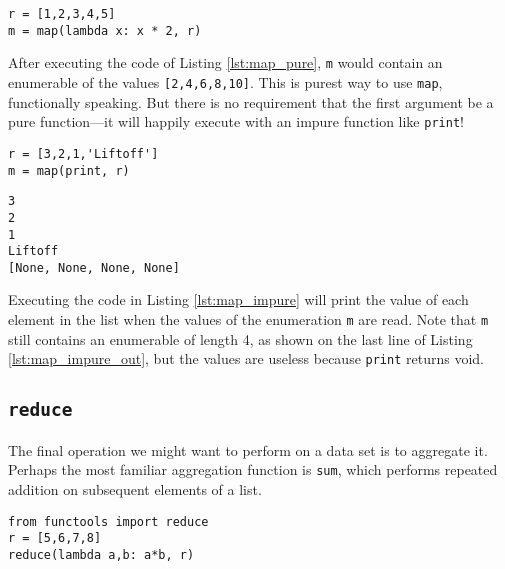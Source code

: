 \documentclass[ignorenonframetext,red]{beamer}
\begin{document}
\begin{frame}[fragile]
\begin{lstlisting}[style=python,caption={Doubling Each Element},label={lst:map_pure}]
r = [1,2,3,4,5]
m = map(lambda x: x * 2, r)
\end{lstlisting}
\end{frame}

\noindent After executing the code of Listing \ref{lst:map_pure}, \texttt{m} would contain an enumerable of the values \texttt{[2,4,6,8,10]}. This is purest way to use \texttt{map}, functionally speaking. But there is no requirement that the first argument be a pure function---it will happily execute with an impure function like \texttt{print}!

\begin{frame}[fragile]
\begin{lstlisting}[style=python,caption={\texttt{map} With an Impure Function},label={lst:map_impure}]
r = [3,2,1,'Liftoff']
m = map(print, r)
\end{lstlisting}
\end{frame}

\begin{lstlisting}[caption={Output of Listing \ref{lst:map_impure}},label={lst:map_impure_out}]
3
2
1
Liftoff
[None, None, None, None]
\end{lstlisting}

\noindent Executing the code in Listing \ref{lst:map_impure} will print the value of each element in the list when the values of the enumeration \texttt{m} are read. Note that \texttt{m} still contains an enumerable of length 4, as shown on the last line of Listing \ref{lst:map_impure_out}, but the values are useless because \texttt{print} returns void.

\subsection{\tt reduce}
The final operation we might want to perform on a data set is to aggregate it. Perhaps the most familiar aggregation function is \texttt{sum}, which performs repeated addition on subsequent elements of a list.

\begin{frame}[fragile]
\begin{lstlisting}[style=python,caption={List Multiplication},label={lst:reduce_mult}]
from functools import reduce
r = [5,6,7,8]
reduce(lambda a,b: a*b, r)
\end{lstlisting}
\end{frame}
\end{document}
